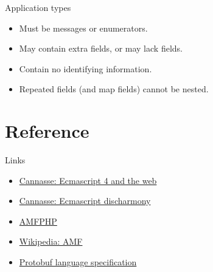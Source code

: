 \documentclass[presentation]{beamer}
\begin{document}
\begin{frame}[label={sec:org1c04bbb}]{Application types}
\begin{itemize}
\item Must be messages or enumerators.
\item May contain extra fields, or may lack fields.
\item Contain no identifying information.
\item Repeated fields (and map fields) cannot be nested.
\end{itemize}
\end{frame}

\section{Reference}
\label{sec:org708a89a}

\begin{frame}[label={sec:org5351bfc}]{Links}
\begin{itemize}
\item \href{http://ncannasse.fr/blog/ecmascript\_4\_and\_the\_web?lang=en}{Cannasse: Ecmascript 4 and the web}
\item \href{http://ncannasse.fr/blog/ecmascript\_disharmony?lang=en}{Cannasse: Ecmascript discharmony}
\item \href{https://www.silexlabs.org/amfphp/}{AMFPHP}
\item \href{https://en.wikipedia.org/wiki/Action\_Message\_Format}{Wikipedia: AMF}
\item \href{https://developers.google.com/protocol-buffers/docs/reference/proto3-spec}{Protobuf language specification}
\end{itemize}
\end{frame}
\end{document}
